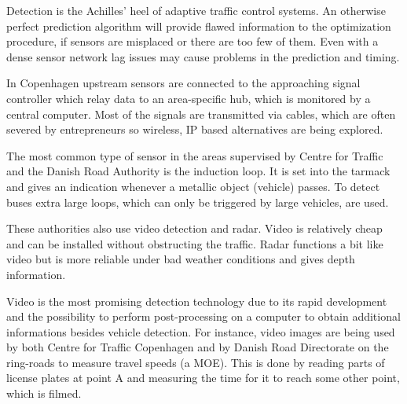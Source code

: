 \label{detection}
Detection is the Achilles' heel of adaptive traffic control systems. An otherwise perfect prediction algorithm will provide flawed information to the optimization procedure, if sensors are misplaced or there are too few of them. Even with a dense sensor network lag issues may cause problems in the prediction and timing.

In Copenhagen upstream sensors are connected to the approaching signal controller which relay data to an area-specific hub, which is monitored by a central computer. Most of the signals are transmitted via cables, which are often severed by entrepreneurs so wireless, IP based alternatives are being explored.

The most common type of sensor in the areas supervised by Centre for Traffic and the Danish Road Authority is the induction loop. It is set into the tarmack and gives an indication whenever a metallic object (vehicle) passes. To detect buses extra large loops, which can only be triggered by large vehicles, are used. 

These authorities also use video detection and radar. Video is relatively cheap and can be installed without obstructing the traffic. Radar functions a bit like video but is more reliable under bad weather conditions and gives depth information.

Video is the most promising detection technology due to its rapid development and the possibility to perform post-processing on a computer to obtain additional informations besides vehicle detection. For instance, video images are being used by both Centre for Traffic Copenhagen and by Danish Road Directorate on the ring-roads to measure travel speeds (a MOE). This is done by reading parts of license plates at point A and measuring the time for it to reach some other point, which is filmed.